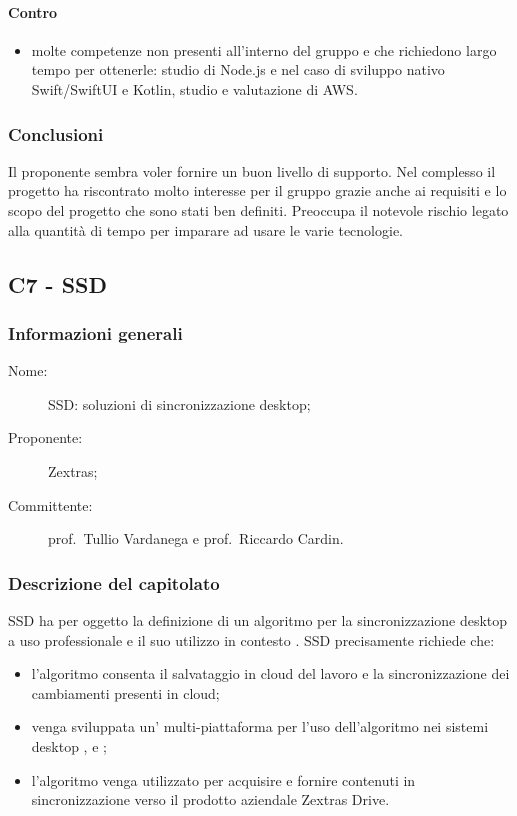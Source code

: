 \paragraph*{Contro}
\begin{itemize}
	\item molte competenze non presenti all'interno del gruppo e che richiedono largo tempo per ottenerle: studio di Node.js e nel caso di sviluppo nativo Swift/SwiftUI e Kotlin, studio e valutazione di AWS.
\end{itemize}
\subsubsection{Conclusioni}
Il proponente sembra voler fornire un buon livello di supporto. Nel complesso il progetto ha riscontrato molto interesse per il gruppo grazie anche ai requisiti e lo scopo del progetto che sono stati ben definiti. Preoccupa il notevole rischio legato alla quantità di tempo per imparare ad usare le varie tecnologie.

\subsection{C7 - SSD}
\subsubsection{Informazioni generali}
\begin{description}
	\item[Nome:] SSD: soluzioni di sincronizzazione desktop;
	\item[Proponente:] Zextras;
	\item[Committente:] prof.~Tullio Vardanega e prof.~Riccardo Cardin.
\end{description}
\subsubsection{Descrizione del capitolato}
SSD ha per oggetto la definizione di un algoritmo per la sincronizzazione desktop a uso professionale e il suo utilizzo in contesto . SSD precisamente richiede che:
\begin{itemize}
	\item l'algoritmo consenta il salvataggio in cloud del lavoro e la sincronizzazione dei cambiamenti presenti in cloud;
	\item venga sviluppata un' multi-piattaforma per l'uso dell'algoritmo nei sistemi desktop ,  e ;
	\item l'algoritmo venga utilizzato per acquisire e fornire contenuti in sincronizzazione verso il prodotto aziendale Zextras Drive.
\end{itemize}
